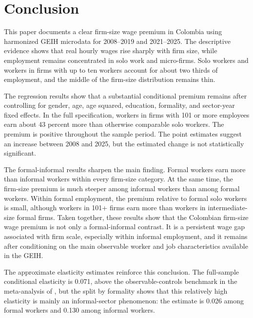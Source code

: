 \section{Conclusion}

This paper documents a clear firm-size wage premium in Colombia using harmonized GEIH microdata for 2008--2019 and 2021--2025. The descriptive evidence shows that real hourly wages rise sharply with firm size, while employment remains concentrated in solo work and micro-firms. Solo workers and workers in firms with up to ten workers account for about two thirds of employment, and the middle of the firm-size distribution remains thin.

The regression results show that a substantial conditional premium remains after controlling for gender, age, age squared, education, formality, and sector-year fixed effects. In the full specification, workers in firms with 101 or more employees earn about 43 percent more than otherwise comparable solo workers. The premium is positive throughout the sample period. The point estimates suggest an increase between 2008 and 2025, but the estimated change is not statistically significant.

The formal-informal results sharpen the main finding. Formal workers earn more than informal workers within every firm-size category. At the same time, the firm-size premium is much steeper among informal workers than among formal workers. Within formal employment, the premium relative to formal solo workers is small, although workers in 101+ firms earn more than workers in intermediate-size formal firms. Taken together, these results show that the Colombian firm-size wage premium is
not only a formal-informal contrast. It is a persistent wage gap associated with firm scale, especially within informal employment, and it remains after conditioning on the main observable worker and job characteristics available in
the GEIH.

The approximate elasticity estimates reinforce this conclusion. The full-sample conditional elasticity is 0.071, above the observable-controls benchmark in the meta-analysis of \citet{DiegmannMullerSchoefer2026}, but the split by formality shows that this relatively high elasticity is mainly an informal-sector phenomenon: the estimate is 0.026 among formal workers and 0.130 among informal workers.
